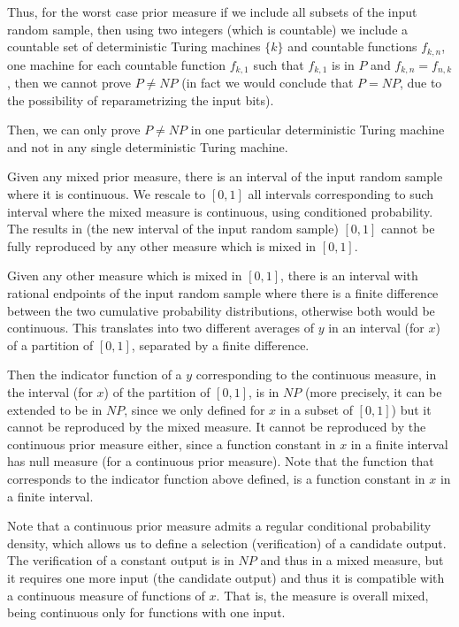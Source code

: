 \documentclass[11pt,a4paper]{report}
\begin{document}
Thus, for the worst case prior measure if we include all subsets of the
input random sample, then using two integers (which is countable) we
include a countable set of deterministic Turing machines \(\{k\}\) and
countable functions \(f_{k,n}\), one machine for each countable function
\(f_{k,1}\) such that \(f_{k,1}\) is in \(P\) and \(f_{k,n}=f_{n,k}\),
then we cannot prove \(P\neq NP\) (in fact we would conclude that
\(P=NP\), due to the possibility of reparametrizing the input bits).

Then, we can only prove \(P\neq NP\) in one particular deterministic
Turing machine and not in any single deterministic Turing machine.

Given any mixed prior measure, there is an interval of the input random
sample where it is continuous. We rescale to \([0,1]\) all intervals
corresponding to such interval where the mixed measure is continuous,
using conditioned probability. The results in (the new interval of the
input random sample) \([0,1]\) cannot be fully reproduced by any other
measure which is mixed in \([0,1]\).

Given any other measure which is mixed in \([0,1]\), there is an
interval with rational endpoints of the input random sample where there
is a finite difference between the two cumulative probability
distributions, otherwise both would be continuous. This translates into
two different averages of \(y\) in an interval (for \(x\)) of a
partition of \([0,1]\), separated by a finite difference.

Then the indicator function of a \(y\) corresponding to the continuous
measure, in the interval (for \(x\)) of the partition of \([0,1]\), is
in \(NP\) (more precisely, it can be extended to be in \(NP\), since we
only defined for \(x\) in a subset of \([0,1]\)) but it cannot be
reproduced by the mixed measure. It cannot be reproduced by the
continuous prior measure either, since a function constant in \(x\) in a
finite interval has null measure (for a continuous prior measure). Note
that the function that corresponds to the indicator function above
defined, is a function constant in \(x\) in a finite interval.

Note that a continuous prior measure admits a regular conditional
probability density, which allows us to define a selection
(verification) of a candidate output. The verification of a constant
output is in \(NP\) and thus in a mixed measure, but it requires one
more input (the candidate output) and thus it is compatible with a
continuous measure of functions of \(x\). That is, the measure is
overall mixed, being continuous only for functions with one input.
\end{document}
